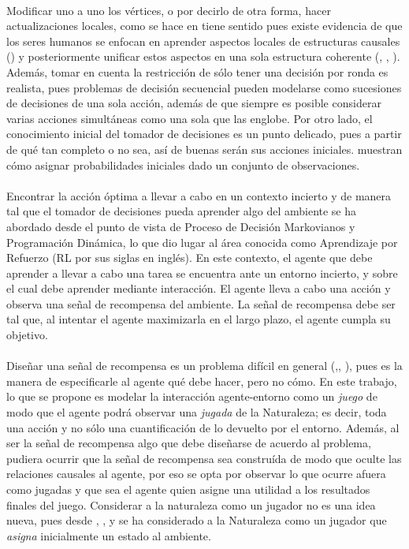 \documentclass[11pt]{article}
\theoremstyle{plain}
\begin{document}
\\
\indent Modificar uno a uno los vértices, o por decirlo de otra forma, hacer actualizaciones locales, como se hace en \cite{lattimoreNIPS2016} tiene sentido pues existe evidencia de que los seres humanos se enfocan en aprender aspectos locales de estructuras causales (\cite{danks2014unifying}) y posteriormente unificar estos aspectos en una sola estructura coherente (\cite{fernbach2009causal}, \cite{waldmann2008causal}, \cite{wellen2012learning}). Además, tomar en cuenta la restricción de sólo tener una decisión por ronda es realista, pues problemas de decisión secuencial pueden modelarse como sucesiones de decisiones de una sola acción, además de que siempre es posible considerar varias acciones simultáneas como una sola que las englobe. Por otro lado, el conocimiento inicial del tomador de decisiones es un punto delicado, pues a partir de qué tan completo o no sea, así de buenas serán sus acciones iniciales. \cite{billot2005probabilities} muestran cómo asignar probabilidades iniciales dado un conjunto de observaciones.\\
\\
\indent Encontrar la acción óptima a llevar a cabo en un contexto incierto y de manera tal que el tomador de decisiones pueda aprender algo del ambiente se ha abordado desde el punto de vista de Proceso de Decisión Markovianos y Programación Dinámica, lo que dio lugar al área conocida como Aprendizaje por Refuerzo (RL por sus siglas en inglés). En este contexto, el agente que debe aprender a llevar a cabo una tarea se encuentra ante un entorno incierto, y sobre el cual debe aprender mediante interacción. El agente lleva a cabo una acción y observa una señal de recompensa del ambiente. La señal de recompensa debe ser tal que, al intentar el agente maximizarla en el largo plazo, el agente cumpla su objetivo.\\
\\
\indent Diseñar una señal de recompensa es un problema difícil en general (\cite{sutton1998reinforcement},\cite{dewey2014reinforcement}, \cite{DRLnotwork}), pues es la manera de especificarle al agente qué debe hacer, pero no cómo. En este trabajo, lo que se propone es modelar la interacción agente-entorno como un \textit{juego} de modo que el agente podrá observar una \textit{jugada} de la Naturaleza; es decir, toda una acción y no sólo una cuantificación de lo devuelto por el entorno.  Además, al ser la señal de recompensa algo que debe diseñarse de acuerdo al problema, pudiera ocurrir que la señal de recompensa sea construída de modo que oculte las relaciones causales al agente, por eso se opta por observar lo que ocurre afuera como jugadas y que sea el agente quien asigne una utilidad a los resultados finales del juego. Considerar a la naturaleza como un jugador no es una idea nueva, pues desde \cite{milnor1951games}, \cite{papadimitriou1985games}, \cite{Szep1985} y \cite{eiselt2004games} se ha considerado a la Naturaleza como un jugador que \textit{asigna} inicialmente un estado al ambiente.\\
\end{document}
